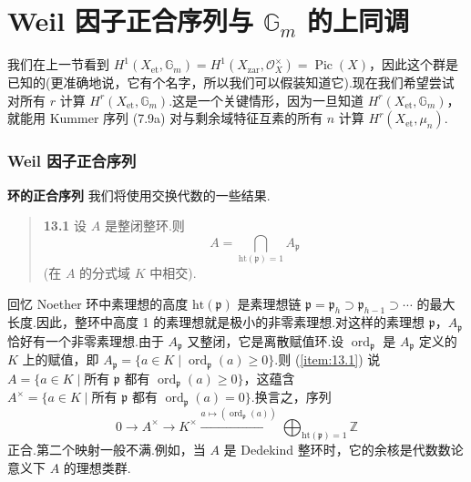 ﻿%
\chapter{\texorpdfstring{Weil 因子正合序列与 $\mathbb{G}_{m}$ 的上同调}{Weil 因子正合序列与 G\_m 的上同调}}\label{sec:13}

我们在上一节看到 $H^{1}(X_{\mathrm{et}}, \mathbb{G}_{m}) = H^{1}(X_{\mathrm{zar}}, \mathcal{O}^{\times}_{X}) = \operatorname{Pic}(X)$，因此这个群是已知的(更准确地说，它有个名字，所以我们可以假装知道它).现在我们希望尝试对所有 $r$ 计算 $H^{r}(X_{\mathrm{et}}, \mathbb{G}_{m})$.这是一个关键情形，因为一旦知道 $H^{r}(X_{\mathrm{et}}, \mathbb{G}_{m})$，就能用 Kummer 序列 (7.9a) 对与剩余域特征互素的所有 $n$ 计算 $H^{r}(X_{\mathrm{et}}, \mu_n)$.

\subsection*{Weil 因子正合序列}

\textbf{环的正合序列} 我们将使用交换代数的一些结果.

\begin{quote}
\label{item:13.1}
\textbf{13.1} 设 $A$ 是整闭整环.则
\[
A = \bigcap_{\mathrm{ht}(\mathfrak{p}) = 1} A_{\mathfrak{p}}
\]
(在 $A$ 的分式域 $K$ 中相交).
\end{quote}

回忆 Noether 环中素理想的高度 $\mathrm{ht}(\mathfrak{p})$ 是素理想链 $\mathfrak{p} = \mathfrak{p}_h \supset \mathfrak{p}_{h-1} \supset \cdots$ 的最大长度.因此，整环中高度 1 的素理想就是极小的非零素理想.对这样的素理想 $\mathfrak{p}$，$A_{\mathfrak{p}}$ 恰好有一个非零素理想.由于 $A_{\mathfrak{p}}$ 又整闭，它是离散赋值环.设 $\operatorname{ord}_{\mathfrak{p}}$ 是 $A_{\mathfrak{p}}$ 定义的 $K$ 上的赋值，即 $A_{\mathfrak{p}} = \{a \in K \mid \operatorname{ord}_{\mathfrak{p}}(a) \geq 0\}$.则 (\ref{item:13.1}) 说 $A = \{a \in K \mid \text{所有 } \mathfrak{p} \text{ 都有 } \operatorname{ord}_{\mathfrak{p}}(a) \geq 0\}$，这蕴含 $A^{\times} = \{a \in K \mid \text{所有 } \mathfrak{p} \text{ 都有 } \operatorname{ord}_{\mathfrak{p}}(a) = 0\}$.换言之，序列
\[
0 \to A^{\times} \to K^{\times} \xrightarrow{a \mapsto (\operatorname{ord}_{\mathfrak{p}}(a))} \bigoplus_{\mathrm{ht}(\mathfrak{p}) = 1} \mathbb{Z}
\]
正合.第二个映射一般不满.例如，当 $A$ 是 Dedekind 整环时，它的余核是代数数论意义下 $A$ 的理想类群.

